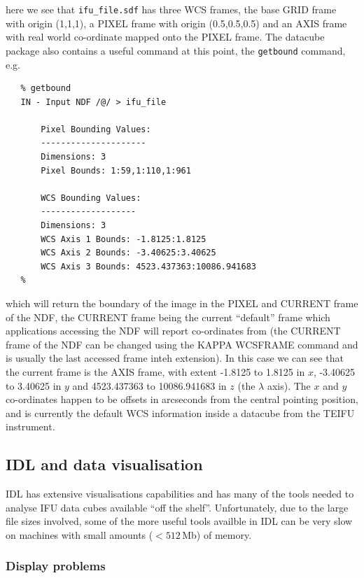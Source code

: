 \documentclass[twoside,11pt]{article}
\newcommand{\htmladdnormallink}[2]{#1}
\newcommand{\xref}[3]{#1}
\newcommand{\xlabel}[1]{}
\begin{document}
here we see that {\tt ifu\_file.sdf} has three WCS frames, the base GRID frame with origin (1,1,1), a PIXEL frame with origin (0.5,0.5,0.5) and an AXIS frame with real world co-ordinate mapped onto the PIXEL frame. The datacube package also contains a useful command at this point, the {\tt getbound} command, e.g.

\small\begin{verbatim}
   % getbound
   IN - Input NDF /@/ > ifu_file

       Pixel Bounding Values:
       ---------------------
       Dimensions: 3
       Pixel Bounds: 1:59,1:110,1:961

       WCS Bounding Values:
       -------------------
       Dimensions: 3
       WCS Axis 1 Bounds: -1.8125:1.8125
       WCS Axis 2 Bounds: -3.40625:3.40625
       WCS Axis 3 Bounds: 4523.437363:10086.941683
   %
\end{verbatim}\normalsize

which will return the boundary of the image in the PIXEL and CURRENT frame of the NDF, the CURRENT frame being the current ``default'' frame which applications accessing the NDF will report co-ordinates from (the CURRENT frame of the NDF can be changed using the KAPPA \xref{WCSFRAME}{sun95}{WCSFRAME} command and is usually the last accessed frame inteh extension). In this case we can see that the current frame is the AXIS frame, with extent -1.8125 to 1.8125 in $x$, -3.40625 to 3.40625 in $y$ and 4523.437363 to 10086.941683 in $z$ (the $\lambda$ axis). The $x$ and $y$ co-ordinates happen to be offsets in arcseconds from the central pointing position, and is currently the default WCS information inside a datacube from the TEIFU instrument. 

\subsection{\xlabel{sc16_idl}IDL and data visualisation\label{sc16_idl}}

\htmladdnormallink{IDL}{http://www.rsinc.com/} has extensive visualisations capabilities and has many of the tools needed to analyse IFU data cubes available ``off the shelf''. Unfortunately, due to the large file sizes involved, some of the more useful tools availble in IDL can be very slow on machines with small amounts ($<512$\,Mb) of memory.

\subsubsection{Display problems}
\end{document}
